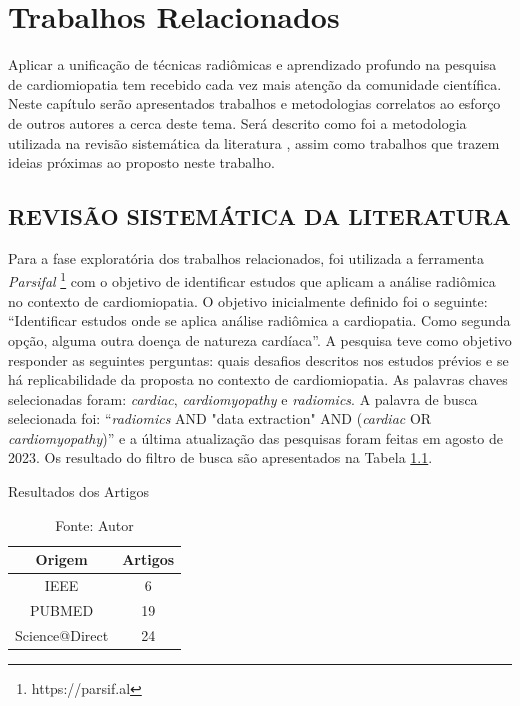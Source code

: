 \chapter{Trabalhos Relacionados}
\label{chap:trabalhos_relacionados}
\vspace{-\baselineskip} %

Aplicar a unificação de técnicas radiômicas e aprendizado profundo na pesquisa de cardiomiopatia tem recebido cada vez mais atenção da comunidade científica.
Neste capítulo serão apresentados trabalhos e metodologias correlatos ao esforço de outros autores a cerca deste tema. Será descrito como foi a metodologia utilizada na revisão sistemática da literatura \cite{petersenGuidelinesConductingSystematic2015a}, assim como trabalhos que trazem ideias próximas ao proposto neste trabalho.

\section{REVISÃO SISTEMÁTICA DA LITERATURA} 
\label{sec:rev_sistematica}

Para a fase exploratória dos trabalhos relacionados, foi utilizada a ferramenta \textit{Parsifal} \footnote{https://parsif.al} com o objetivo de identificar estudos que aplicam a análise radiômica no contexto de cardiomiopatia. O objetivo inicialmente definido foi o seguinte: ``Identificar estudos onde se aplica análise radiômica a cardiopatia. Como segunda opção, alguma outra doença de natureza cardíaca''. A pesquisa teve como objetivo responder as seguintes perguntas: quais desafios descritos nos estudos prévios e se há replicabilidade da proposta no contexto de cardiomiopatia. As palavras chaves selecionadas foram: \textit{cardiac}, \textit{cardiomyopathy} e \textit{radiomics}. A palavra de busca selecionada foi: ``\textit{radiomics} AND "data extraction" AND (\textit{cardiac} OR \textit{cardiomyopathy})'' e a última atualização das pesquisas foram feitas em agosto de 2023. Os resultado do filtro de busca são apresentados na Tabela \ref{tab:resultado_busca}. 
\newline

\begin{table}[hbtp]
    \caption{Resultados dos Artigos}
    \centering
    \renewcommand{\arraystretch}{1.4} %
    \begin{tabular}{|c|c|}
    \hline 
          \textbf{Origem} & \textbf{Artigos}  \\ 
    \hline 
        IEEE & 6 \\ 
        PUBMED & 19 \\ 
        Science@Direct & 24 \\ 
    \hline 
    \end{tabular} 
    \caption*{Fonte: Autor}
    \label{tab:resultado_busca}
\end{table}

